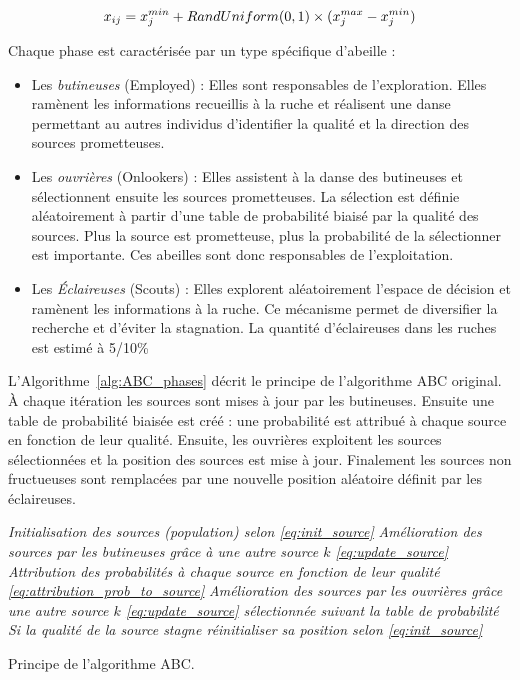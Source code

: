 \begin{equation}\label{eq:init_source}
  x_{ij} = x_{j}^{min} + RandUniform(0, 1) \times (x_{j}^{max} - x_{j}^{min}) \\
\end{equation}

\noindent Chaque phase est caractérisée par un type spécifique d’abeille :
\begin{itemize}
  \item Les \emph{butineuses} (Employed) : Elles sont responsables de l’exploration.
        Elles ramènent les informations recueillis à la ruche et réalisent une danse
        permettant au autres individus d’identifier la qualité et la direction des
        sources prometteuses.
  \item Les \emph{ouvrières} (Onlookers) : Elles assistent à la danse des butineuses
        et sélectionnent ensuite les sources prometteuses. La sélection est définie
        aléatoirement à partir d’une table de probabilité biaisé par la qualité des sources.
        Plus la source est prometteuse, plus la probabilité de la sélectionner est importante.
        Ces abeilles sont donc responsables de l’exploitation.
  \item Les \emph{Éclaireuses} (Scouts) : Elles explorent aléatoirement l’espace
        de décision et ramènent les informations à la ruche. Ce mécanisme
        permet de diversifier la recherche et d’éviter la stagnation. La quantité
        d’éclaireuses dans les ruches est estimé à 5/10\si{\percent} \parencite{Seeley1996}
\end{itemize}

L’Algorithme~\ref{alg:ABC_phases} décrit le principe de l’algorithme ABC original.
À chaque itération les sources sont mises à jour par les butineuses. Ensuite une
table de probabilité biaisée est créé : une probabilité est attribué à chaque source
en fonction de leur qualité. Ensuite, les ouvrières exploitent les sources sélectionnées
et la position des sources est mise à jour. Finalement les sources non fructueuses sont
remplacées par une nouvelle position aléatoire définit par les éclaireuses.
\begin{algorithm}\label{alg:ABC_phases}
  \SetAlgoVlined
  \emph{Initialisation des sources (population) selon \eqref{eq:init_source}}\;
  {
  {
    \emph{Amélioration des sources par les butineuses grâce à une autre source $k$ \eqref{eq:update_source}}\;
    \emph{Attribution des probabilités à chaque source en fonction de leur qualité
          \eqref{eq:attribution_prob_to_source}}\;
    \emph{Amélioration des sources par les ouvrières grâce une autre source $k$ \eqref{eq:update_source}
          sélectionnée suivant la table de probabilité}\;
    \emph{Si la qualité de la source stagne réinitialiser sa position selon \eqref{eq:init_source}}\;
  }
  }
  \caption{Principe de l’algorithme ABC.}
\end{algorithm}


